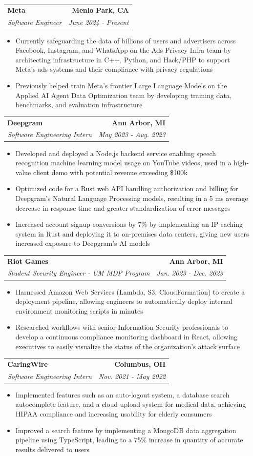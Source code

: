 \documentclass[letterpaper,11pt]{article}
\makeatletter
\newcommand{\resumeItem}[1]{
  \item\small{
    {#1 \vspace{-3pt}}
  }
}
\newcommand{\resumeSubheading}[4]{
  \vspace{-3pt}\item
    \begin{tabular*}{1.0\textwidth}[t]{l@{\extracolsep{\fill}}r}
      \textbf{#1} & \textbf{\small #2} \\
      \textit{\small#3} & \textit{\small #4} \\
    \end{tabular*}\vspace{-7pt}
}
\newcommand{\resumeItemListStart}{\begin{itemize}}
\newcommand{\resumeItemListEnd}{\end{itemize}\vspace{0pt}}
\makeatother
\begin{document}
\resumeSubheading
{Meta}{Menlo Park, CA}
{Software Engineer}{June 2024 - Present}
\resumeItemListStart
\resumeItem{Currently safeguarding the data of billions of users and advertisers across Facebook, Instagram, and WhatsApp on the Ads Privacy Infra team by architecting infrastructure in C++, Python, and Hack/PHP to support Meta's ads systems and their compliance with privacy regulations}
\resumeItem{Previously helped train Meta's frontier Large Language Models on the Applied AI Agent Data Optimization team by developing training data, benchmarks, and evaluation infrastructure}
\resumeItemListEnd

\resumeSubheading
{Deepgram}{Ann Arbor, MI}
{Software Engineering Intern}{May 2023 - Aug. 2023}
\resumeItemListStart
\resumeItem{Developed and deployed a Node.js backend service enabling speech recognition machine learning model usage on YouTube videos, used in a high-value client demo with potential revenue exceeding \$100k}
\resumeItem{Optimized code for a Rust web API handling authorization and billing for Deepgram’s Natural Language Processing models, resulting in a 5 ms average decrease in response time and greater standardization of error messages}
\resumeItem{Increased account signup conversions by 7\% by implementing an IP caching system in Rust and deploying it to on-premises data centers, giving new users increased exposure to Deepgram’s AI models}
\resumeItemListEnd

\resumeSubheading
{Riot Games}{Ann Arbor, MI}
{Student Security Engineer - UM MDP Program}{Jan. 2023 - Dec. 2023}
\resumeItemListStart
\resumeItem{Harnessed Amazon Web Services (Lambda, S3, CloudFormation) to create a deployment pipeline, allowing engineers to automatically deploy internal environment monitoring scripts in minutes}
\resumeItem{Researched workflows with senior Information Security professionals to develop a continuous compliance monitoring dashboard in React, allowing executives to easily visualize the status of the organization’s attack surface}
\resumeItemListEnd

\resumeSubheading
{CaringWire}{Columbus, OH}
{Software Engineering Intern}{Nov. 2021 - May 2022}
\resumeItemListStart
\resumeItem{Implemented features such as an auto-logout system, a database search autocomplete feature, and a cloud upload system for medical data, achieving HIPAA compliance and increasing usability for elderly consumers}
\resumeItem{Improved a search feature by implementing a MongoDB data aggregation pipeline using TypeScript, leading to a 75\% increase in quantity of accurate results delivered to users}
\resumeItemListEnd
\end{document}
